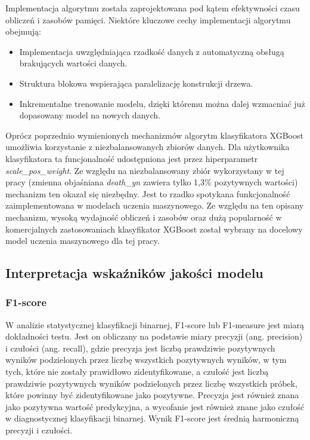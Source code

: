 \documentclass[polish, twoside, 12pt, a4paper]{article}
\theoremstyle{definition}
\theoremstyle{plain}
\theoremstyle{remark}
\begin{document}
Implementacja algorytmu została zaprojektowana pod kątem efektywności czasu obliczeń i zasobów pamięci. Niektóre kluczowe cechy implementacji algorytmu obejmują:
\begin{itemize}
 \item Implementacja uwzględniająca rzadkość danych z automatyczną obsługą brakujących wartości danych.
 \item Struktura blokowa wspierająca paralelizację konstrukcji drzewa.
 \item Inkrementalne trenowanie modelu, dzięki któremu można dalej wzmacniać już dopasowany model na nowych danych.
\end{itemize}

Oprócz poprzednio wymienionych mechanizmów algorytm klasyfikatora XGBoost umożliwia korzystanie z niezbalansowanych zbiorów danych. Dla użytkownika klasyfikatora ta funcjonalność udostępniona jest przez hiperparametr \emph{scale\_pos\_weight}. Ze względu na niezbalansowany zbiór wykorzystany w tej pracy (zmienna objaśniana \emph{death\_yn} zawiera tylko 1,3\% pozytywnych wartości) mechanizm ten okazał się niezbędny. Jest to rzadko spotykana funkcjonalność zaimplementowana w modelach uczenia maszynowego. Ze względu na ten opisany mechanizm, wysoką wydajność obliczeń i zasobów oraz dużą popularność w komercjalnych zastosowaniach klasyfikator XGBoost został wybrany na docelowy model uczenia maszynowego dla tej pracy. 

\subsection{Interpretacja wskaźników jakości modelu}

\subsubsection{F1-score}

W analizie statystycznej klasyfikacji binarnej, F1-score lub F1-measure jest miarą dokładności testu. Jest on obliczany na podstawie miary precyzji (ang. precision) i czułości (ang. recall), gdzie precyzja jest liczbą prawdziwie pozytywnych wyników podzielonych przez liczbę wszystkich pozytywnych wyników, w tym tych, które nie zostały prawidłowo zidentyfikowane, a czułość jest liczbą prawdziwie pozytywnych wyników podzielonych przez liczbę wszystkich próbek, które powinny być zidentyfikowane jako pozytywne. Precyzja jest również znana jako pozytywna wartość predykcyjna, a wycofanie jest również znane jako czułość w diagnostycznej klasyfikacji binarnej. Wynik F1-score jest średnią harmoniczną precyzji i czułości. 
\end{document}
